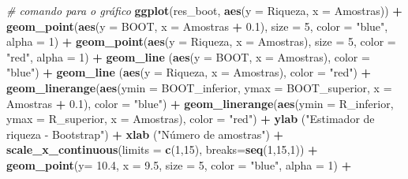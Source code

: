 \documentclass[
]{book}
\newenvironment{Shaded}{\begin{snugshade}}{\end{snugshade}}
\newcommand{\CommentTok}[1]{\textcolor[rgb]{0.56,0.35,0.01}{\textit{#1}}}
\newcommand{\DataTypeTok}[1]{\textcolor[rgb]{0.13,0.29,0.53}{#1}}
\newcommand{\DecValTok}[1]{\textcolor[rgb]{0.00,0.00,0.81}{#1}}
\newcommand{\FloatTok}[1]{\textcolor[rgb]{0.00,0.00,0.81}{#1}}
\newcommand{\KeywordTok}[1]{\textcolor[rgb]{0.13,0.29,0.53}{\textbf{#1}}}
\newcommand{\NormalTok}[1]{#1}
\newcommand{\OperatorTok}[1]{\textcolor[rgb]{0.81,0.36,0.00}{\textbf{#1}}}
\newcommand{\StringTok}[1]{\textcolor[rgb]{0.31,0.60,0.02}{#1}}
\begin{document}
\begin{Shaded}
\begin{Highlighting}[]
\CommentTok{# comando para o gráfico}
\KeywordTok{ggplot}\NormalTok{(res_boot, }\KeywordTok{aes}\NormalTok{(}\DataTypeTok{y =}\NormalTok{ Riqueza, }\DataTypeTok{x =}\NormalTok{ Amostras)) }\OperatorTok{+}
\StringTok{  }\KeywordTok{geom_point}\NormalTok{(}\KeywordTok{aes}\NormalTok{(}\DataTypeTok{y =}\NormalTok{ BOOT, }\DataTypeTok{x =}\NormalTok{ Amostras }\OperatorTok{+}\StringTok{ }\FloatTok{0.1}\NormalTok{), }\DataTypeTok{size =} \DecValTok{5}\NormalTok{, }\DataTypeTok{color =} \StringTok{"blue"}\NormalTok{, }\DataTypeTok{alpha =} \DecValTok{1}\NormalTok{) }\OperatorTok{+}
\StringTok{  }\KeywordTok{geom_point}\NormalTok{(}\KeywordTok{aes}\NormalTok{(}\DataTypeTok{y =}\NormalTok{ Riqueza, }\DataTypeTok{x =}\NormalTok{ Amostras), }\DataTypeTok{size =} \DecValTok{5}\NormalTok{, }\DataTypeTok{color =} \StringTok{"red"}\NormalTok{, }\DataTypeTok{alpha =} \DecValTok{1}\NormalTok{) }\OperatorTok{+}
\StringTok{  }\KeywordTok{geom_line}\NormalTok{ (}\KeywordTok{aes}\NormalTok{(}\DataTypeTok{y =}\NormalTok{ BOOT, }\DataTypeTok{x =}\NormalTok{ Amostras), }\DataTypeTok{color =} \StringTok{"blue"}\NormalTok{) }\OperatorTok{+}
\StringTok{  }\KeywordTok{geom_line}\NormalTok{ (}\KeywordTok{aes}\NormalTok{(}\DataTypeTok{y =}\NormalTok{ Riqueza, }\DataTypeTok{x =}\NormalTok{ Amostras), }\DataTypeTok{color =} \StringTok{"red"}\NormalTok{) }\OperatorTok{+}
\StringTok{  }\KeywordTok{geom_linerange}\NormalTok{(}\KeywordTok{aes}\NormalTok{(}\DataTypeTok{ymin =}\NormalTok{ BOOT_inferior, }\DataTypeTok{ymax =}\NormalTok{ BOOT_superior, }\DataTypeTok{x =}\NormalTok{ Amostras }\OperatorTok{+}\StringTok{ }\FloatTok{0.1}\NormalTok{),}
 \DataTypeTok{color =} \StringTok{"blue"}\NormalTok{) }\OperatorTok{+}
\StringTok{  }\KeywordTok{geom_linerange}\NormalTok{(}\KeywordTok{aes}\NormalTok{(}\DataTypeTok{ymin =}\NormalTok{ R_inferior, }\DataTypeTok{ymax =}\NormalTok{ R_superior, }\DataTypeTok{x =}\NormalTok{ Amostras), }\DataTypeTok{color =} \StringTok{"red"}\NormalTok{) }\OperatorTok{+}
\StringTok{  }\KeywordTok{ylab}\NormalTok{ (}\StringTok{"Estimador de riqueza - Bootstrap"}\NormalTok{) }\OperatorTok{+}
\StringTok{  }\KeywordTok{xlab}\NormalTok{ (}\StringTok{"Número de amostras"}\NormalTok{) }\OperatorTok{+}
\StringTok{  }\KeywordTok{scale_x_continuous}\NormalTok{(}\DataTypeTok{limits =} \KeywordTok{c}\NormalTok{(}\DecValTok{1}\NormalTok{,}\DecValTok{15}\NormalTok{), }\DataTypeTok{breaks=}\KeywordTok{seq}\NormalTok{(}\DecValTok{1}\NormalTok{,}\DecValTok{15}\NormalTok{,}\DecValTok{1}\NormalTok{)) }\OperatorTok{+}
\StringTok{  }\KeywordTok{geom_point}\NormalTok{(}\DataTypeTok{y=} \FloatTok{10.4}\NormalTok{, }\DataTypeTok{x =} \FloatTok{9.5}\NormalTok{, }\DataTypeTok{size =} \DecValTok{5}\NormalTok{, }\DataTypeTok{color =} \StringTok{"blue"}\NormalTok{, }\DataTypeTok{alpha =} \DecValTok{1}\NormalTok{) }\OperatorTok{+}\StringTok{ }

\end{Highlighting}
\end{Shaded}
\end{document}
